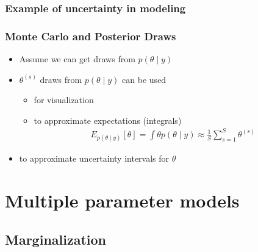 \documentclass[10pt]{beamer}
\begin{document}
\begin{frame}

\frametitle{Example of uncertainty in modeling}



\end{frame}
\begin{frame}

\frametitle{Monte Carlo and Posterior Draws}

  \begin{itemize}
  \item Assume we can get draws from $p(\theta \mid y)$
  \pause
  \item $\theta^{(s)}$ draws from $p(\theta \mid y)$ can be used
    \begin{itemize}
    \item<1-> for visualization
    \item<2-> to approximate expectations (integrals)
      \begin{align*}
        E_{p(\theta \mid y)}[\theta] = \int \theta p(\theta \mid y) \approx \frac{1}{S}\sum_{s=1}^{S} \theta^{(s)}
      \end{align*}
    \end{itemize}
    \item<3-> to approximate uncertainty intervals for $\theta$
  \end{itemize}

\end{frame}

\section{Multiple parameter models}
\subsection{Marginalization}
\end{document}
